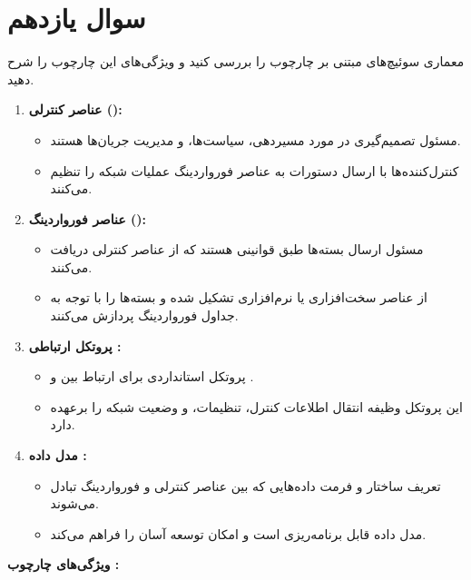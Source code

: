 \section{سوال یازدهم}

معماری سوئیچ‌های مبتنی بر چارچوب  را بررسی کنید و ویژگی‌های این چارچوب را شرح دهید.

\begin{qsolve}
	\begin{enumerate}
		\item \textbf{عناصر کنترلی ():}
		\begin{itemize}
			\item مسئول تصمیم‌گیری در مورد مسیردهی، سیاست‌ها، و مدیریت جریان‌ها هستند.
			\item کنترل‌کننده‌ها با ارسال دستورات به عناصر فورواردینگ عملیات شبکه را تنظیم می‌کنند.
		\end{itemize}
		
		\item \textbf{عناصر فورواردینگ ():}
		\begin{itemize}
			\item مسئول ارسال بسته‌ها طبق قوانینی هستند که از عناصر کنترلی دریافت می‌کنند.
			\item از عناصر سخت‌افزاری یا نرم‌افزاری تشکیل شده و بسته‌ها را با توجه به جداول فورواردینگ پردازش می‌کنند.
		\end{itemize}
		
		\item \textbf{پروتکل ارتباطی :}
		\begin{itemize}
			\item پروتکل استانداردی برای ارتباط بین  و .
			\item این پروتکل وظیفه انتقال اطلاعات کنترل، تنظیمات، و وضعیت شبکه را برعهده دارد.
		\end{itemize}
		
		\item \textbf{مدل داده :}
		\begin{itemize}
			\item تعریف ساختار و فرمت داده‌هایی که بین عناصر کنترلی و فورواردینگ تبادل می‌شوند.
			\item مدل داده قابل برنامه‌ریزی است و امکان توسعه آسان را فراهم می‌کند.
		\end{itemize}
	\end{enumerate}
	
	\textbf{ویژگی‌های چارچوب :}
	

\end{qsolve}
